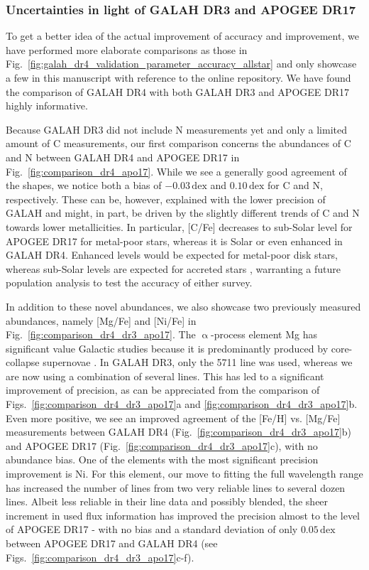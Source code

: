 \documentclass[
  journal=pasa,
  manuscript=research-paper, %
  year=2024,
  volume=37
]{cup-journal}
\newcommand\ion[2]{\text{#1\,\textsc{\lowercase{#2}}}}	%
\newcommand{\dex}{\,\mathrm{dex}}	%
\begin{document}
\subsubsection{Uncertainties in light of GALAH DR3 and APOGEE DR17}

To get a better idea of the actual improvement of accuracy and improvement, we have performed more elaborate comparisons as those in Fig.~\ref{fig:galah_dr4_validation_parameter_accuracy_allstar} and only showcase a few in this manuscript with reference to the online repository. We have found the comparison of GALAH DR4 with both GALAH DR3 and APOGEE DR17 highly informative.

Because GALAH DR3 did not include N measurements yet and only a limited amount of C measurements, our first comparison concerns the abundances of C and N between GALAH DR4 and APOGEE DR17 in Fig.~\ref{fig:comparison_dr4_apo17}. While we see a generally good agreement of the shapes, we notice both a bias of $-0.03\dex$ and $0.10\dex$ for C and N, respectively. These can be, however, explained with the lower precision of GALAH and might, in part, be driven by the slightly different trends of C and N towards lower metallicities. In particular, [C/Fe] decreases to sub-Solar level for APOGEE DR17 for metal-poor stars, whereas it is Solar or even enhanced in GALAH DR4. Enhanced levels would be expected for metal-poor disk stars, whereas sub-Solar levels are expected for accreted stars \citep{Amarsi2019c}, warranting a future population analysis to test the accuracy of either survey.

In addition to these novel abundances, we also showcase two previously measured abundances, namely [Mg/Fe] and [Ni/Fe] in Fig.~\ref{fig:comparison_dr4_dr3_apo17}. The $\upalpha$-process element Mg has significant value Galactic studies because it is predominantly produced by core-collapse supernovae \citep{Kobayashi2020}. In GALAH DR3, only the \ion{Mg}{i}5711 line was used, whereas we are now using a combination of several lines. This has led to a significant improvement of precision, as can be appreciated from the comparison of Figs.~\ref{fig:comparison_dr4_dr3_apo17}a and \ref{fig:comparison_dr4_dr3_apo17}b. Even more positive, we see an improved agreement of the [Fe/H] vs. [Mg/Fe] measurements between GALAH DR4 (Fig.~\ref{fig:comparison_dr4_dr3_apo17}b) and APOGEE DR17 (Fig.~\ref{fig:comparison_dr4_dr3_apo17}c), with no abundance bias. One of the elements with the most significant precision improvement is Ni. For this element, our move to fitting the full wavelength range has increased the number of lines from two very reliable lines to several dozen lines. Albeit less reliable in their line data and possibly blended, the sheer increment in used flux information has improved the precision almost to the level of APOGEE DR17 - with no bias and a standard deviation of only $0.05\,\mathrm{dex}$ between APOGEE DR17 and GALAH DR4 (see Figs.~\ref{fig:comparison_dr4_dr3_apo17}c-f).
\end{document}
